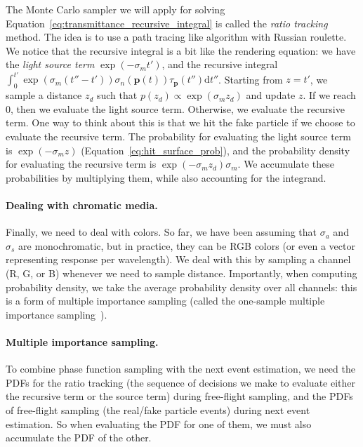 The Monte Carlo sampler we will apply for solving Equation~\ref{eq:transmittance_recursive_integral} is called the \emph{ratio tracking} method. The idea is to use a path tracing like algorithm with Russian roulette. We notice that the recursive integral is a bit like the rendering equation: we have the \emph{light source term} $\exp\left(-\sigma_m t'\right)$, and the recursive integral $\int_{0}^{t'} \exp\left(\sigma_m (t''-t')\right) \sigma_n(\mathbf{p}(t)) \tau_{\mathbf{p}}(t'') \mathrm{d}t''$. 
Starting from $z=t'$, we sample a distance $z_d$ such that $p(z_d) \propto \exp\left(\sigma_m z_d\right)$ and update $z$. If we reach 0, then we evaluate the light source term. Otherwise, we evaluate the recursive term. One way to think about this is that we hit the fake particle if we choose to evaluate the recursive term. The probability for evaluating the light source term is $\exp\left(-\sigma_m z\right)$ (Equation~\ref{eq:hit_surface_prob}), and the probability density for evaluating the recursive term is $\exp\left(-\sigma_m z_d\right) \sigma_m$. We accumulate these probabilities by multiplying them, while also accounting for the integrand.

\paragraph{Dealing with chromatic media.} Finally, we need to deal with colors. So far, we have been assuming that $\sigma_a$ and $\sigma_s$ are monochromatic, but in practice, they can be RGB colors (or even a vector representing response per wavelength). We deal with this by sampling a channel (R, G, or B) whenever we need to sample distance. Importantly, when computing probability density, we take the average probability density over all channels: this is a form of multiple importance sampling (called the one-sample multiple importance sampling~\cite{Veach:1995:OCS}).

\paragraph{Multiple importance sampling.} To combine phase function sampling with the next event estimation, we need the PDFs for the ratio tracking (the sequence of decisions we make to evaluate either the recursive term or the source term) during free-flight sampling, and the PDFs of free-flight sampling (the real/fake particle events) during next event estimation. So when evaluating the PDF for one of them, we must also accumulate the PDF of the other.

